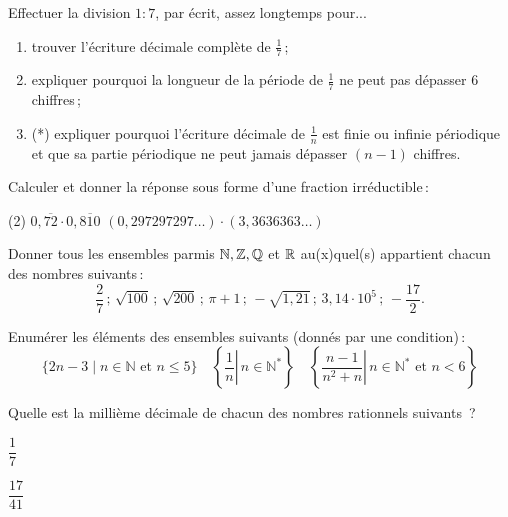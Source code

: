 \documentclass[a4paper,12pt]{report}
\begin{document}
\vspace*{-2\baselineskip}
\begin{acti}
Effectuer la division $1: 7$, par écrit, assez longtemps pour...
\begin{enumerate}
\item trouver l'écriture décimale complète de $\frac{1}{7}$\,;
\item expliquer pourquoi la longueur de la période de $\frac{1}{7}$ ne peut pas dépasser 6 chiffres\,;
\item (*) expliquer pourquoi l'écriture décimale de $\frac{1}{n}$ est finie ou infinie périodique et que sa partie périodique ne peut jamais dépasser $(n-1)$ chiffres.
\end{enumerate}
\end{acti}
\begin{acti}
Calculer et donner la réponse sous forme d'une fraction irréductible\,:
\begin{tasks}(2)
\task $0, \overline{72} \cdot 0, \overline{810}$
\task $(0,297297297 \ldots) \cdot(3,3636363 \ldots)$
\end{tasks}
\end{acti}
\begin{acti}
	Donner tous les ensembles parmis $\mathbb N, \mathbb Z, \mathbb Q$ et $\mathbb R$ au(x)quel(s) appartient chacun des nombres suivants\,: 
	\[\dfrac{2}{7}\,;\,\sqrt{100}\,;\,\sqrt{200}\,;\,\pi+1\,;\,-\sqrt{1,21}\,;\,3,14\cdot 10^5\,;\, -\dfrac{17}{2}.\] 
\end{acti}
\begin{acti}
Enumérer les éléments des ensembles suivants (donnés par une condition)\,:
\[
\{2 n-3 \mid n \in \mathbb{N} \text { et } n \leq 5\} \quad
\left\{\left.\dfrac{1}{n} \right\rvert\, n \in \mathbb{N}^*\right\}\quad 
\left\{\left.\dfrac{n-1}{n^2+n} \right\rvert\, n \in \mathbb{N}^* \text { et } n<6\right\}
\]
\end{acti}
\begin{exo}
Quelle est la millième décimale de chacun des nombres rationnels suivants~?
\begin{inlineumerate}
\item $\dfrac{1}{7}$
\item $\dfrac{17}{41}$
\end{inlineumerate}
\end{exo}
\end{document}
